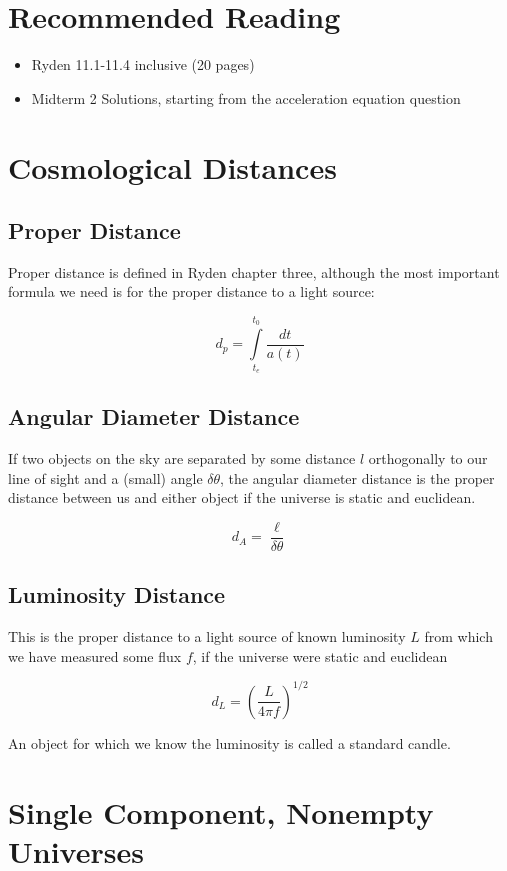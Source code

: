 \documentclass[12pt]{article}
\begin{document}
\section{Recommended Reading}

\begin{itemize}
\item Ryden 11.1-11.4 inclusive (20 pages)
\item Midterm 2 Solutions, starting from the acceleration equation question
\end{itemize}

\section{Cosmological Distances}

\subsection{Proper Distance}

Proper distance is defined in Ryden chapter three, although the most important formula we need is for the proper distance to a light source:

\[ d_p = \int\limits_{t_e}^{t_0}\frac{dt}{a(t)}
\]




\subsection{Angular Diameter Distance}
If two objects on the sky are separated by some distance \(l\) orthogonally to our line of sight and a (small) angle \(\delta \theta\), the angular diameter distance is the proper distance between us and either object if the universe is static and euclidean.

\[ d_A = \frac{\ell}{\delta \theta}
\]
\subsection{Luminosity Distance}

This is the proper distance to a light source of known luminosity \(L\) from which we have measured some flux \(f\), if the universe were static and euclidean

\[ d_L = \left(\frac{L}{4\pi f}\right)^{1/2}
\]

An object for which we know the luminosity is called a standard candle.

\section{Single Component, Nonempty Universes}
\end{document}

